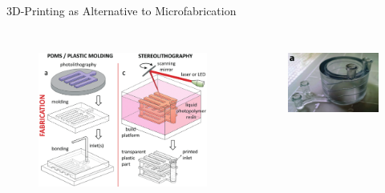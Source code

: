 \documentclass{beamer}
\begin{document}
\begin{frame}{3D-Printing as Alternative to Microfabrication}
\begin{columns}[c] %
\begin{figure}
\includegraphics[width=0.8\linewidth]{images/3D-fab.png}\\
\hspace*{11pt}\hbox{\scriptsize {}}
 \end{figure}
\begin{figure}
\includegraphics[width=1\linewidth]{images/folch1.png}\\

\end{figure}
\end{columns}
\end{frame}
\end{document}

